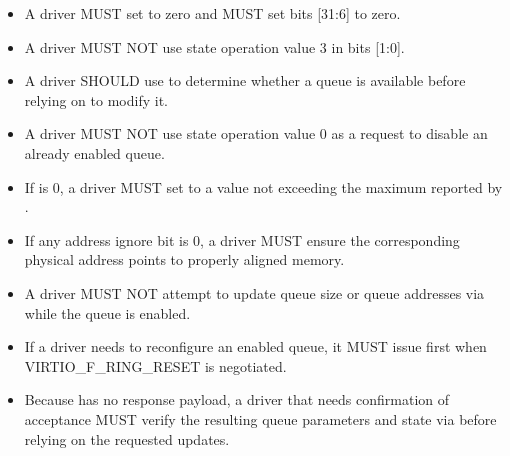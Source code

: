 \begin{itemize}
  \item A driver MUST set  to zero and MUST set 
        bits [31:6] to zero.
  \item A driver MUST NOT use state operation value 3 in  bits
        [1:0].
  \item A driver SHOULD use  to determine whether a queue is
        available before relying on  to modify it.
  \item A driver MUST NOT use state operation value 0 as a request to disable an
        already enabled queue.
  \item If  is 0, a driver MUST set  to a value
        not exceeding the maximum reported by .
  \item If any address ignore bit is 0, a driver MUST ensure the corresponding
        physical address points to properly aligned memory.
  \item A driver MUST NOT attempt to update queue size or queue addresses via
         while the queue is enabled.
  \item If a driver needs to reconfigure an enabled queue, it MUST issue
         first when VIRTIO\_F\_RING\_RESET is negotiated.
  \item Because  has no response payload, a driver that
        needs confirmation of acceptance MUST verify the resulting queue
        parameters and state via  before relying on the
        requested updates.
\end{itemize}

